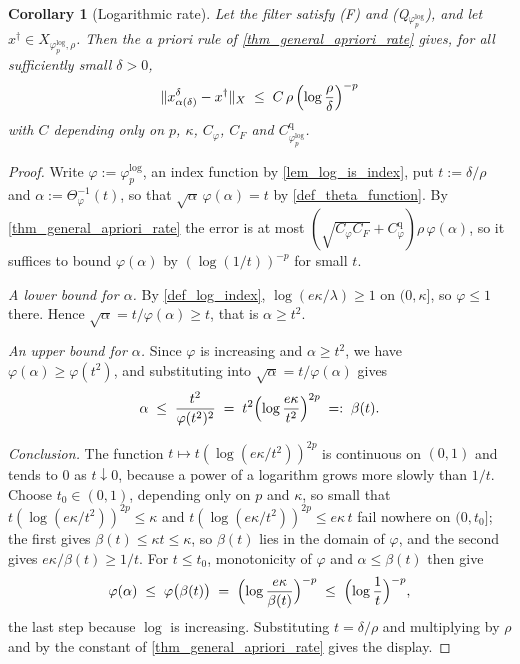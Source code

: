 \documentclass[a4paper]{report}
\theoremstyle{plain}
\newtheorem{corollary}[theorem]{Corollary}
\theoremstyle{definition}
\theoremstyle{remark}
\newcommand{\dg}{^{\dagger}}
\begin{document}
\begin{corollary}[Logarithmic rate]
  \label{cor_log_rate}
  Let the filter satisfy (F) and (Q$_{\varphi^{\log}_p}$), and let
  $x\dg \in X_{\varphi^{\log}_{p},\rho}$.  Then the a priori rule of
  \cref{thm_general_apriori_rate} gives, for all sufficiently small $\delta > 0$,
  \[
    \|x^{\delta}_{\alpha(\delta)} - x\dg\|_X \;\le\;
      C\,\rho\,\Bigl(\log\frac{\rho}{\delta}\Bigr)^{-p}
  \]
  with $C$ depending only on $p$, $\kappa$, $C_{\varphi}$, $C_F$ and
  $C^{\mathrm{q}}_{\varphi^{\log}_p}$.
\end{corollary}
\begin{proof}
  Write $\varphi := \varphi^{\log}_p$, an index function by \cref{lem_log_is_index}, put
  $t := \delta/\rho$ and $\alpha := \Theta_{\varphi}^{-1}(t)$, so that
  $\sqrt{\alpha}\,\varphi(\alpha) = t$ by \cref{def_theta_function}.  By
  \cref{thm_general_apriori_rate} the error is at most
  $(\sqrt{C_{\varphi}C_F}+C^{\mathrm{q}}_{\varphi})\rho\,\varphi(\alpha)$, so it suffices
  to bound $\varphi(\alpha)$ by $(\log(1/t))^{-p}$ for small $t$.

  \emph{A lower bound for $\alpha$.}  By \cref{def_log_index},
  $\log(e\kappa/\lambda) \ge 1$ on $(0,\kappa]$, so $\varphi \le 1$ there.  Hence
  $\sqrt{\alpha} = t/\varphi(\alpha) \ge t$, that is $\alpha \ge t^{2}$.

  \emph{An upper bound for $\alpha$.}  Since $\varphi$ is increasing and
  $\alpha \ge t^{2}$, we have $\varphi(\alpha) \ge \varphi(t^{2})$, and substituting into
  $\sqrt{\alpha} = t/\varphi(\alpha)$ gives
  \[
    \alpha \;\le\; \frac{t^{2}}{\varphi(t^{2})^{2}}
      \;=\; t^{2}\Bigl(\log\frac{e\kappa}{t^{2}}\Bigr)^{2p} \;=:\; \beta(t) .
  \]

  \emph{Conclusion.}  The function $t \mapsto t(\log(e\kappa/t^{2}))^{2p}$ is continuous
  on $(0,1)$ and tends to $0$ as $t \downarrow 0$, because a power of a logarithm grows
  more slowly than $1/t$.  Choose $t_0 \in (0,1)$, depending only on $p$ and $\kappa$, so
  small that $t(\log(e\kappa/t^{2}))^{2p} \le \kappa$ and
  $t(\log(e\kappa/t^{2}))^{2p} \le e\kappa\,t$ fail nowhere on $(0,t_0]$; the first gives
  $\beta(t) \le \kappa t \le \kappa$, so $\beta(t)$ lies in the domain of $\varphi$, and
  the second gives $e\kappa/\beta(t) \ge 1/t$.  For $t \le t_0$, monotonicity of $\varphi$
  and $\alpha \le \beta(t)$ then give
  \[
    \varphi(\alpha) \;\le\; \varphi\bigl(\beta(t)\bigr)
      \;=\; \Bigl(\log\frac{e\kappa}{\beta(t)}\Bigr)^{-p}
      \;\le\; \Bigl(\log\frac{1}{t}\Bigr)^{-p} ,
  \]
  the last step because $\log$ is increasing.  Substituting $t = \delta/\rho$ and
  multiplying by $\rho$ and by the constant of \cref{thm_general_apriori_rate} gives the
  display.
\end{proof}
\end{document}
